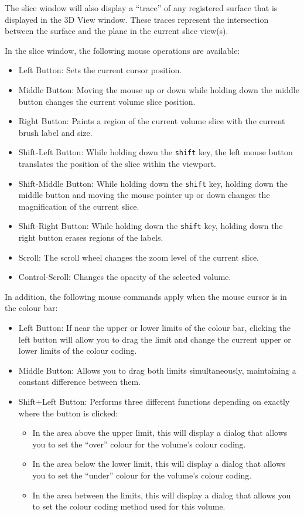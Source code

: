 \documentclass[11pt,letterpaper]{article}
\newcommand{\ident}[1]{{\tt #1}}
\begin{document}
The slice window will also display a ``trace'' of any registered
surface that is displayed in the 3D View window. These traces
represent the intersection between the surface and the plane in the
current slice view(s).

In the slice window, the following mouse operations are available:

\begin{itemize}
\item Left Button: Sets the current cursor position.
\item Middle Button: Moving the mouse up or down while holding down
  the middle button changes the current volume slice position.
\item Right Button: Paints a region of the current volume slice with the
current brush label and size.
\item Shift-Left Button: While holding down the \ident{shift} key, the
  left mouse button translates the position of the slice within the
  viewport.
\item Shift-Middle Button: While holding down the \ident{shift} key,
  holding down the middle button and moving the mouse pointer up or down
  changes the magnification of the current slice.
\item Shift-Right Button: While holding down the \ident{shift} key,
  holding down the right button erases regions of the labels.
\item Scroll: The scroll wheel changes the zoom level of the current slice.
\item Control-Scroll: Changes the opacity of the selected volume.
\end{itemize}

In addition, the following mouse commands apply when the mouse cursor is in the colour bar:
\begin{itemize}
\item Left Button: If near the upper or lower limits of the colour bar,
clicking the left button will allow you to drag the limit and change the
current upper or lower limits of the colour coding.
\item Middle Button: Allows you to drag both limits simultaneously, maintaining a 
constant difference between them.
\item Shift+Left Button: Performs three different functions depending on
exactly where the button is clicked:
\begin{itemize}
\item In the area above the upper limit,
 this will display a dialog that allows you to set the ``over'' colour
 for the volume's colour coding.
\item In the area below the lower limit,
 this will display a dialog that allows you to set the ``under'' colour
 for the volume's colour coding.
\item In the area between the limits, this will display a dialog that
allows you to set the colour coding method used for this volume.
\end{itemize}
\end{itemize}
\end{document}
